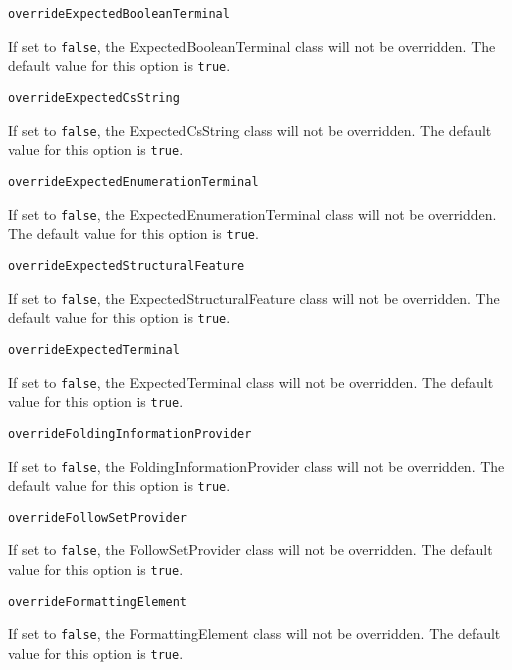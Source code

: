 \noindent\texttt{overrideExpectedBooleanTerminal}
\begin{myindentpar}{1cm}
If set to \texttt{false}, the ExpectedBooleanTerminal class will not be overridden. The default value for this option is \texttt{true}.
\end{myindentpar}

\noindent\texttt{overrideExpectedCsString}
\begin{myindentpar}{1cm}
If set to \texttt{false}, the ExpectedCsString class will not be overridden. The default value for this option is \texttt{true}.
\end{myindentpar}

\noindent\texttt{overrideExpectedEnumerationTerminal}
\begin{myindentpar}{1cm}
If set to \texttt{false}, the ExpectedEnumerationTerminal class will not be overridden. The default value for this option is \texttt{true}.
\end{myindentpar}

\noindent\texttt{overrideExpectedStructuralFeature}
\begin{myindentpar}{1cm}
If set to \texttt{false}, the ExpectedStructuralFeature class will not be overridden. The default value for this option is \texttt{true}.
\end{myindentpar}

\noindent\texttt{overrideExpectedTerminal}
\begin{myindentpar}{1cm}
If set to \texttt{false}, the ExpectedTerminal class will not be overridden. The default value for this option is \texttt{true}.
\end{myindentpar}

\noindent\texttt{overrideFoldingInformationProvider}
\begin{myindentpar}{1cm}
If set to \texttt{false}, the FoldingInformationProvider class will not be overridden. The default value for this option is \texttt{true}.
\end{myindentpar}

\noindent\texttt{overrideFollowSetProvider}
\begin{myindentpar}{1cm}
If set to \texttt{false}, the FollowSetProvider class will not be overridden. The default value for this option is \texttt{true}.
\end{myindentpar}

\noindent\texttt{overrideFormattingElement}
\begin{myindentpar}{1cm}
If set to \texttt{false}, the FormattingElement class will not be overridden. The default value for this option is \texttt{true}.
\end{myindentpar}


